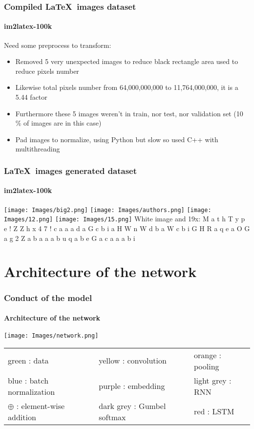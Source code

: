 \documentclass{beamer}
\begin{document}
\begin{frame}

    \frametitle{Compiled \LaTeX~images dataset}
    \framesubtitle{\hfill im2latex-100k}

Need some preprocess to transform:
\newline
\begin{itemize}[label=$\bullet$]
  \item Removed 5 very unexpected images to reduce black rectangle area used to reduce pixels number
  \item Likewise total pixels number from 64,000,000,000 to 11,764,000,000, it is a 5.44 factor
  \item Furthermore these 5 images weren't in train, nor test, nor validation set (10 \% of images are in this case)
  \item Pad images to normalize, using Python but slow so used C++ with multithreading
\end{itemize}

\end{frame}

\begin{frame}

    \frametitle{\LaTeX~images generated dataset}
    \framesubtitle{\hfill im2latex-100k}
    
\texttt{[image: Images/big2.png]}
\texttt{[image: Images/authors.png]}
\texttt{[image: Images/12.png]}
\texttt{[image: Images/15.png]}
White image and 19x: M a t h T y p e ! Z Z h x 4 7 ! c a a a d a G c b i a H W n W d b a W c b i G H R a q e a O G a g 2 Z a b a a a b u q a b e G a c a a a b i

\end{frame}


\section{Architecture of the network}

\begin{frame}
    \frametitle{Conduct of the model}
    \framesubtitle{\hfill Architecture of the network}

\hspace*{-0.7cm}\texttt{[image: Images/network.png]}

\vspace{1cm}
\footnotesize

\begin{tabular}{l|l|l}
    green : data & yellow : convolution & orange : pooling\\
    blue : batch normalization & purple : embedding & light grey : RNN\\
    $\oplus$ : element-wise addition & dark grey : Gumbel softmax & red : LSTM
\end{tabular}

\end{frame}
\end{document}
